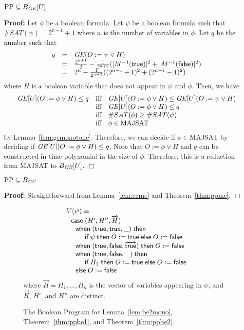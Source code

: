 \documentclass{llncs}
\newenvironment{proof}{\noindent\rm{\bf Proof:}}{\hbox{$\Box$}\vspace*{0.2\baselineskip}}
\newenvironment{reftheorem}[1]{\begin{trivlist}\item[\hskip
      \labelsep{\bf Theorem #1.}]\it}{\end{trivlist}}
\newcommand{\ttif}[3]{\textsf{if}\;{#1}\;\textsf{then}\;{#2}\;\textsf{else}\;{#3}}
\newcommand{\vect}[1]{\overrightarrow{{#1}}}
\begin{document}
\begin{reftheorem}{\ref{thm:ppge}}
$\text{PP}\subseteq B_{\it GE}[U]$
\end{reftheorem}
\begin{proof}
Let $\phi$ be a boolean formula.  Let $\psi$ be a boolean formula
such that  $\#SAT(\psi)=2^{n-1}+1$ where $n$ is the number of variables in $\phi$.  Let $q$ be the number such that
\[
\begin{array}{rcl}
  q&=&{\it GE}(O:=\psi\vee H)\\
  &=&\frac{2^{n+1}}{2}-\frac{1}{2^{n+2}}(|M^{-1}({\sf true})|^2+|M^{-1}({\sf
    false})|^2)\\
  &=&2^n-\frac{1}{2^{n+2}}((2^{n-1}+1)^2+(2^{n-1}-1)^2)
\end{array}
\]
where $H$ is a boolean variable that does not appear in $\psi$ and $\phi$.  
Then, we have
\[
\begin{array}{rcl}
{\it GE}[U](O:=\phi\vee H)\le q & \textrm{iff}&
{\it GE}[U](O:=\phi\vee H)\leq {\it GE}[U](O:=\psi\vee H) \\
& \textrm{iff}& {\it GE}[U](O:=\phi\vee H)\le q\\
  &\textrm{iff}& \#SAT(\phi)\ge\#SAT(\psi)\\
  &\textrm{iff}& \phi\in\textrm{MAJSAT}
\end{array}
\]
by Lemma~\ref{lem:gemonotone}.  Therefore, we can decide if
$\phi\in\textrm{MAJSAT}$ by deciding if ${\it GE}[U](O:=\phi\vee H)\le
q$.  Note that $O:=\phi\vee H$ and $q$ can be constructed in time
polynomial in the size of $\phi$.  Therefore, this is a reduction from
\textrm{MAJSAT} to $B_{\it GE}[U]$.
\end{proof}


\begin{reftheorem}{\ref{thm:ppcc}}
  $\text{PP}\subseteq B_{\it CC}$
\end{reftheorem}
\begin{proof}
  Straightforward from Lemma~\ref{lem:ccme} and Theorem~\ref{thm:ppme}.
\end{proof}

\begin{figure}[t]
\[
\begin{array}{l}
V(\psi)\equiv\\
\ \ {\sf case}\;(H',H'',\vect{H})\\
\ \ \ \ {\sf when}\;({\sf true},{\sf true},\_)\;{\sf then}\;\\
\ \ \ \ \ \ \ \ \ttif{\psi}{O:={\sf true}}{O:={\sf false}} \\
\ \ \ \ {\sf when}\;({\sf true},{\sf false},\vect{\sf true})\;{\sf then}\;O:={\sf false}\\
\ \ \ \ {\sf when}\;({\sf true},{\sf false},\_)\;{\sf then}\;\\
\ \ \ \ \ \ \ \ \ttif{H_1}{O:={\sf true}}{O:={\sf false}} \\
\ \ \ \ {\sf else}\;{O:={\sf false}}
\end{array}
\]
where ${\vect H}=H_1, \dots, H_h$ is the vector of variables appearing in 
$\psi$, and $\vect H$, $H'$, and $H''$ are distinct.
\caption{The Boolean Program for Lemma~\ref{lem:be2mono}, Theorem~\ref{thm:ppbe1}, and Theorem~\ref{thm:ppbe2}.}
\label{fig:boolenc3}
\end{figure}
\end{document}
